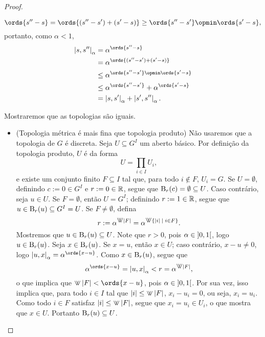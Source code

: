 \begin{proof}
\begin{itemize}
			\begin{equation*}
			\ords{s''-s} = \ords{(s''-s') + (s'-s)} \geq \ords{s''-s'} \opmin \ords{s'-s},
			\end{equation*}
		portanto, como $\alpha<1$,
			\begin{align*}
			\dist{s}{s''}_\alpha &= \alpha^{\ords{s''-s}} \\
				&= \alpha^{\ords{(s''-s') + (s'-s)}} \\
				&\leq \alpha^{\ords{s''-s'} \opmin \ords{s'-s}} \\
				&\leq \alpha^{\ords{s''-s'}} + \alpha^{\ords{s'-s}} \\
				&= \dist{s}{s'}_\alpha + \dist{s'}{s''}_\alpha.
			\end{align*}
	\end{itemize}

	Mostraremos que as topologias são iguais.

	\begin{itemize}
	\item (Topologia métrica é mais fina que topologia produto) Não usaremos que a topologia de $G$ é discreta. Seja $U \subseteq G^{I}$ um aberto básico. Por definição da topologia produto, $U$ é da forma
	\begin{equation*}
	U = \prod_{i \in I} U_i,
	\end{equation*}
	e existe um conjunto finito $F \subseteq I$ tal que, para todo $i \notin F$, $U_i = G$. Se $U = \emptyset$, %
	definindo $c := 0 \in G^{I}$ e $r := 0 \in \mathbb{R}$, segue que $\mathrm{B}_r(c) = \emptyset \subseteq U$. Caso contrário, seja $u \in U$. Se $F = \emptyset$, então $U = G^{I}$; definindo $r:=1 \in \mathbb{R}$, segue que $u \in \mathrm{B}_r(u) \subseteq G^{I} = U$. Se $F \neq \emptyset$, defina
		\begin{equation*}
		r := \alpha^{\max\abs{F}} = \alpha^{\max\set{\abs{i}}{i \in F}}.
		\end{equation*}
	Mostremos que $u \in \mathrm{B}_r(u) \subseteq U$. Note que $r>0$, pois $\alpha \in \left]{0},{1}\right[$, logo $u \in \mathrm{B}_r(u)$. Seja $x \in \mathrm{B}_r(u)$. Se $x=u$, então $x \in U$; caso contrário, $x-u \neq 0$, logo $\dist{u}{x}_\alpha = \alpha^{\ords{x-u}}$. %
	Como $x \in \mathrm{B}_r(u)$, segue que
		\begin{equation*}
		\alpha^{\ords{x-u}} = \dist{u}{x}_\alpha< r = \alpha^{\max\abs{F}},
		\end{equation*}
	o que implica que $\max\abs{F} < \ords{x-u}$, pois $\alpha \in \left]{0},{1}\right[$. Por sua vez, isso implica que, para todo $i \in I$ tal que $\abs{i} \leq \max\abs{F}$, $x_i - u_i = 0$, ou seja, $x_i = u_i$. Como todo $i \in F$ satisfaz $\abs{i} \leq \max\abs{F}$, segue que $x_i = u_i \in U_i$, o que mostra que $x \in U$. Portanto $\mathrm{B}_r(u) \subseteq U$.


\end{itemize}
\end{proof}
